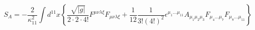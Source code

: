 \begin{equation}
S_A=-\frac{2}{\kappa_{11}^2}\int d^{11}x  \left\{
\frac{\sqrt{|g|}}{2\cdot 2\cdot 4!}F^{\mu\nu\lambda\xi}F_{\mu\nu\lambda\xi} +\frac{1}{12}
\frac{1}{3!(4!)^2}\epsilon^{\mu_1\ldots \mu_{11}}
A_{\mu_1\mu_2\mu_3}F_{\mu_4\ldots \mu_7}F_{\mu_8\ldots \mu_{11}}\right\}
\end{equation} 
